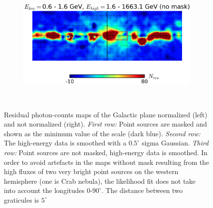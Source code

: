 \documentclass[a4paper]{article}
\begin{document}
\begin{figure}[H]
{\begin{subfigure}[b]{.5\textwidth}
	\end{subfigure}%
	\begin{subfigure}[b]{.5\textwidth}
		\centering
		\includegraphics[width=.95\textwidth]{gnomview_highEsmooth_nonorm_nomask}
	\end{subfigure}%
	}\\
\caption{Residual photon-counts maps of the Galactic plane normalized (left) and not normalized (right). \textit{First row:} Point sources are masked and shown as the minimum value of the scale (dark blue). \textit{Second row:} The high-energy data is smoothed with a $0.5^\circ$ sigma Gaussian. \textit{Third row:} Point sources are not masked, high-energy data is smoothed. In order to avoid artefacts in the maps without mask resulting from the high fluxes of two very bright point sources on the western hemisphere (one is Crab nebula), the likelihood fit does not take into account the longitudes 0-$90^\circ$. The distance between two graticules is $5^\circ$}
\label{Fit_IC_pi0_to_ROI}
\end{figure}
\end{document}
